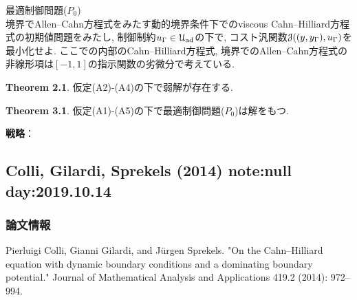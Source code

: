 \documentclass[openary, a4paper, oneside]{jsarticle}
\begin{document}
最適制御問題($P_0$)\\
境界でAllen--Cahn方程式をみたす動的境界条件下でのviscous Cahn--Hilliard方程式の初期値問題をみたし,
制御制約$u_{\Gamma}\in \mathcal{U}_{\mathrm{ad}}$の下で,
コスト汎関数$\mathcal{J}((y,y_{\Gamma}),u_{\Gamma})$を最小化せよ.
ここでの内部のCahn--Hilliard方程式, 境界でのAllen--Cahn方程式の非線形項は$[-1,1]$の指示関数の劣微分で考えている.

{\bf Theorem 2.1}.
仮定(A2)-(A4)の下で弱解が存在する.

{\bf Theorem 3.1}.
仮定(A1)-(A5)の下で最適制御問題($P_0$)は解をもつ.

{\bf 戦略}：



\newpage

\subsection{Colli, Gilardi, Sprekels (2014) \cite{ColliGilardiSprekels2014} note:null day:2019.10.14}
	\subsubsection{論文情報}
	Pierluigi Colli, Gianni Gilardi, and J\"urgen Sprekels. "On the Cahn--Hilliard equation with dynamic boundary conditions and a dominating boundary potential." Journal of Mathematical Analysis and Applications 419.2 (2014): 972--994.	
\end{document}
